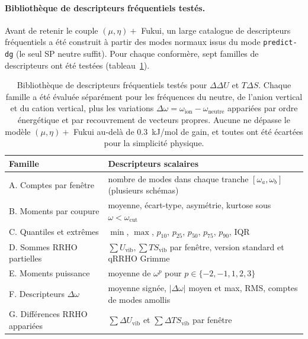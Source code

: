 \paragraph{Bibliothèque de descripteurs fréquentiels testés.}
Avant de retenir le couple $(\mu, \eta) + $ Fukui, un large catalogue de descripteurs fréquentiels a été construit à partir des modes normaux issus du mode \texttt{predict-dg} (le seul SP neutre suffit). Pour chaque conformère, sept familles de descripteurs ont été testées (tableau~\ref{tab:app_freq_descr}).

\begin{table}[H]
\centering
\caption{Bibliothèque de descripteurs fréquentiels testés pour $\Delta\Delta U$ et $T\Delta S$. Chaque famille a été évaluée séparément pour les fréquences du neutre, de l'anion vertical et du cation vertical, plus les variations $\Delta\omega = \omega_\text{ion} - \omega_\text{neutre}$ appariées par ordre énergétique et par recouvrement de vecteurs propres. Aucune ne dépasse le modèle $(\mu, \eta) + $ Fukui au-delà de $0.3$~kJ/mol de gain, et toutes ont été écartées pour la simplicité physique.}
\label{tab:app_freq_descr}
\footnotesize
\begin{tabular}{l l}
\toprule
\textbf{Famille} & \textbf{Descripteurs scalaires} \\
\midrule
A. Comptes par fenêtre & nombre de modes dans chaque tranche $[\omega_a, \omega_b]$ (plusieurs schémas) \\
B. Moments par coupure & moyenne, écart-type, asymétrie, kurtose sous $\omega < \omega_\text{cut}$ \\
C. Quantiles et extrêmes & $\min$, $\max$, $p_{10}$, $p_{25}$, $p_{50}$, $p_{75}$, $p_{90}$, IQR \\
D. Sommes RRHO partielles & $\sum U_\text{vib}, \sum T S_\text{vib}$ par fenêtre, version standard et qRRHO Grimme \\
E. Moments puissance & moyenne de $\omega^p$ pour $p \in \{-2, -1, 1, 2, 3\}$ \\
F. Descripteurs $\Delta\omega$ & moyenne signée, $|\Delta\omega|$ moyen et max, RMS, comptes de modes amollis \\
G. Différences RRHO appariées & $\sum \Delta U_\text{vib}$ et $\sum \Delta T S_\text{vib}$ par fenêtre \\
\bottomrule
\end{tabular}
\end{table}

